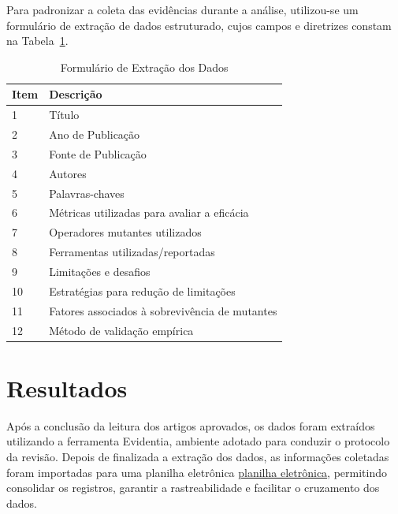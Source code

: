 Para padronizar a coleta das evidências durante a análise, utilizou-se um formulário de extração de dados estruturado, cujos campos e diretrizes constam na Tabela~\ref{tab:formulario-extracao}.

\begin{table}[htb]
    \centering
    \caption{Formulário de Extração dos Dados}
    \label{tab:formulario-extracao}
    \begin{tabularx}{0.95\textwidth}{|l|X|}
        \hline
        \textbf{Item} & \textbf{Descrição} \\ \hline
        1 & Título \\ \hline
        2 & Ano de Publicação \\ \hline
        3 & Fonte de Publicação \\ \hline
        4 & Autores \\ \hline
        5 & Palavras-chaves \\ \hline
        6 & Métricas utilizadas para avaliar a eficácia \\ \hline
        7 & Operadores mutantes utilizados \\ \hline
        8 & Ferramentas utilizadas/reportadas \\ \hline
        9 & Limitações e desafios \\ \hline
        10 & Estratégias para redução de limitações \\ \hline
        11 & Fatores associados à sobrevivência de mutantes \\ \hline
        12 & Método de validação empírica \\ \hline
    \end{tabularx}
\end{table}

\section{Resultados}
\label{sec:resultados}

Após a conclusão da leitura dos artigos aprovados, os dados foram extraídos utilizando a ferramenta Evidentia, ambiente adotado para conduzir o protocolo da revisão. Depois de finalizada a extração dos dados, as informações coletadas foram importadas para uma planilha eletrônica \href{https://docs.google.com/spreadsheets/d/1vhQH-s1NbXxbqH6Kie3z7ZXoASvZnZw09Wph0cionCQ/edit?usp=sharing}{planilha eletrônica}, permitindo consolidar os registros, garantir a rastreabilidade e facilitar o cruzamento dos dados.

